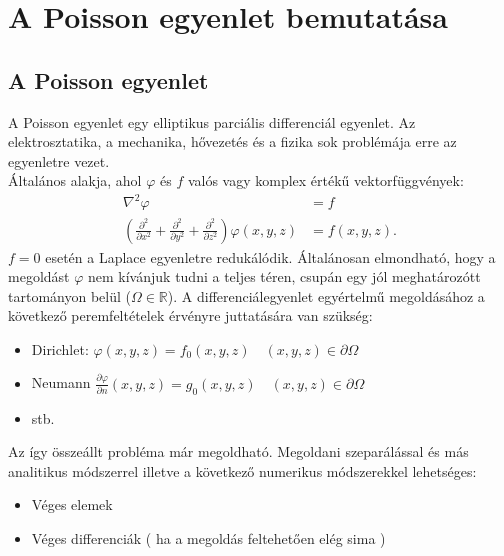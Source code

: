 \chapter{A Poisson egyenlet bemutatása}
\section{A Poisson egyenlet}

A Poisson egyenlet egy elliptikus parciális differenciál egyenlet.
Az elektrosztatika, a mechanika, hővezetés és a fizika sok problémája erre az egyenletre vezet.\\
Általános alakja, ahol $\varphi$ és $f$ valós vagy komplex értékű vektorfüggvények:
\begin{align}
\nabla^2 \varphi &= f\\
\left( \frac{\partial^2}{\partial x^2} + \frac{\partial^2}{\partial y^2} + \frac{\partial^2}{\partial z^2} \right)\varphi(x,y,z) &= f(x,y,z).
\end{align}
$f = 0$ esetén a Laplace egyenletre redukálódik.
Általánosan elmondható, hogy a megoldást $\varphi$ nem kívánjuk tudni a teljes téren, csupán
egy jól meghatározótt tartományon belül ($\Omega \in \mathbb{R}$).
A differenciálegyenlet egyértelmű megoldásához a következő peremfeltételek érvényre juttatására van szükség:
\begin{itemize}
\item Dirichlet: $\varphi(x,y,z) = f_0(x,y,z) \quad (x,y,z) \in \partial\Omega$
\item Neumann $\frac{\partial\varphi}{\partial n}(x,y,z) = g_0(x,y,z) \quad (x,y,z) \in \partial\Omega$
\item stb.
\end{itemize}
Az így összeállt probléma már megoldható.
Megoldani szeparálással és más analitikus módszerrel illetve a következő numerikus módszerekkel lehetséges:
\begin{itemize}
\item Véges elemek
\item Véges differenciák ( ha a megoldás feltehetően elég sima )
\end{itemize}
\newpage

